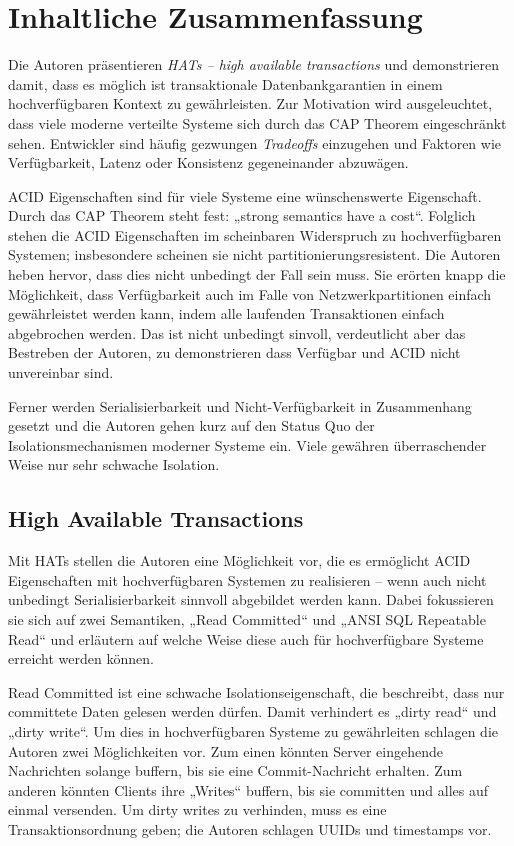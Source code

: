 \section{Inhaltliche Zusammenfassung}

Die Autoren präsentieren \textit{HATs -- high available transactions} und demonstrieren damit, dass es möglich ist transaktionale Datenbankgarantien in einem hochverfügbaren Kontext zu gewährleisten. Zur Motivation wird ausgeleuchtet, dass viele moderne verteilte Systeme sich durch das CAP Theorem eingeschränkt sehen. Entwickler sind häufig gezwungen \textit{Tradeoffs} einzugehen und Faktoren wie Verfügbarkeit, Latenz oder Konsistenz gegeneinander abzuwägen. 

ACID Eigenschaften sind für viele Systeme eine wünschenswerte Eigenschaft. Durch das CAP Theorem steht fest: „strong semantics have a cost“\cite{hnc13}. Folglich stehen die ACID Eigenschaften im scheinbaren Widerspruch zu hochverfügbaren Systemen; insbesondere scheinen sie nicht partitionierungsresistent. Die Autoren heben hervor, dass dies nicht unbedingt der Fall sein muss. Sie erörten knapp die Möglichkeit, dass Verfügbarkeit auch im Falle von Netzwerkpartitionen einfach gewährleistet werden kann, indem alle laufenden Transaktionen einfach abgebrochen werden. Das ist nicht unbedingt sinvoll, verdeutlicht aber das Bestreben der Autoren, zu demonstrieren dass Verfügbar und ACID nicht unvereinbar sind.

Ferner werden Serialisierbarkeit und Nicht-Verfügbarkeit in Zusammenhang gesetzt und die Autoren gehen kurz auf den Status Quo der Isolationsmechanismen moderner Systeme ein. Viele gewähren überraschender Weise nur sehr schwache Isolation.


\subsection{High Available Transactions}
Mit HATs stellen die Autoren eine Möglichkeit vor, die es ermöglicht ACID Eigenschaften mit hochverfügbaren Systemen zu realisieren -- wenn auch nicht unbedingt Serialisierbarkeit sinnvoll abgebildet werden kann. Dabei fokussieren sie sich auf zwei Semantiken, „Read Committed“ und „ANSI SQL Repeatable Read“ und erläutern auf welche Weise diese auch für hochverfügbare Systeme erreicht werden können.

Read Committed ist eine schwache Isolationseigenschaft, die beschreibt, dass nur committete Daten gelesen werden dürfen. Damit verhindert es „dirty read“ und „dirty write“. Um dies in hochverfügbaren Systeme zu gewährleiten schlagen die Autoren zwei Möglichkeiten vor. Zum einen könnten Server eingehende Nachrichten solange buffern, bis sie eine Commit-Nachricht erhalten. Zum anderen könnten Clients ihre „Writes“ buffern, bis sie committen und alles auf einmal versenden. Um dirty writes zu verhinden, muss es eine Transaktionsordnung geben; die Autoren schlagen UUIDs und timestamps vor.

